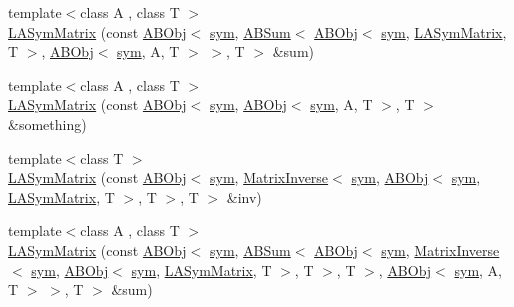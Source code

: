 \begin{DoxyCompactItemize}
\item 
{\footnotesize template$<$class A , class T $>$ }\\\mbox{\hyperlink{classROOT_1_1Minuit2_1_1LASymMatrix_a252615373ae5ffe035baa9e8221e67e3}{L\+A\+Sym\+Matrix}} (const \mbox{\hyperlink{classROOT_1_1Minuit2_1_1ABObj}{A\+B\+Obj}}$<$ \mbox{\hyperlink{classROOT_1_1Minuit2_1_1sym}{sym}}, \mbox{\hyperlink{classROOT_1_1Minuit2_1_1ABSum}{A\+B\+Sum}}$<$ \mbox{\hyperlink{classROOT_1_1Minuit2_1_1ABObj}{A\+B\+Obj}}$<$ \mbox{\hyperlink{classROOT_1_1Minuit2_1_1sym}{sym}}, \mbox{\hyperlink{classROOT_1_1Minuit2_1_1LASymMatrix}{L\+A\+Sym\+Matrix}}, T $>$, \mbox{\hyperlink{classROOT_1_1Minuit2_1_1ABObj}{A\+B\+Obj}}$<$ \mbox{\hyperlink{classROOT_1_1Minuit2_1_1sym}{sym}}, A, T $>$ $>$, T $>$ \&sum)
\item 
{\footnotesize template$<$class A , class T $>$ }\\\mbox{\hyperlink{classROOT_1_1Minuit2_1_1LASymMatrix_ac807736f91c64875cb01e13050a6c925}{L\+A\+Sym\+Matrix}} (const \mbox{\hyperlink{classROOT_1_1Minuit2_1_1ABObj}{A\+B\+Obj}}$<$ \mbox{\hyperlink{classROOT_1_1Minuit2_1_1sym}{sym}}, \mbox{\hyperlink{classROOT_1_1Minuit2_1_1ABObj}{A\+B\+Obj}}$<$ \mbox{\hyperlink{classROOT_1_1Minuit2_1_1sym}{sym}}, A, T $>$, T $>$ \&something)
\item 
{\footnotesize template$<$class T $>$ }\\\mbox{\hyperlink{classROOT_1_1Minuit2_1_1LASymMatrix_a0089b4055d0d08767d7072657b6f87d5}{L\+A\+Sym\+Matrix}} (const \mbox{\hyperlink{classROOT_1_1Minuit2_1_1ABObj}{A\+B\+Obj}}$<$ \mbox{\hyperlink{classROOT_1_1Minuit2_1_1sym}{sym}}, \mbox{\hyperlink{classROOT_1_1Minuit2_1_1MatrixInverse}{Matrix\+Inverse}}$<$ \mbox{\hyperlink{classROOT_1_1Minuit2_1_1sym}{sym}}, \mbox{\hyperlink{classROOT_1_1Minuit2_1_1ABObj}{A\+B\+Obj}}$<$ \mbox{\hyperlink{classROOT_1_1Minuit2_1_1sym}{sym}}, \mbox{\hyperlink{classROOT_1_1Minuit2_1_1LASymMatrix}{L\+A\+Sym\+Matrix}}, T $>$, T $>$, T $>$ \&inv)
\item 
{\footnotesize template$<$class A , class T $>$ }\\\mbox{\hyperlink{classROOT_1_1Minuit2_1_1LASymMatrix_a50ecd9916b1ca8941c767d16dbdb9b65}{L\+A\+Sym\+Matrix}} (const \mbox{\hyperlink{classROOT_1_1Minuit2_1_1ABObj}{A\+B\+Obj}}$<$ \mbox{\hyperlink{classROOT_1_1Minuit2_1_1sym}{sym}}, \mbox{\hyperlink{classROOT_1_1Minuit2_1_1ABSum}{A\+B\+Sum}}$<$ \mbox{\hyperlink{classROOT_1_1Minuit2_1_1ABObj}{A\+B\+Obj}}$<$ \mbox{\hyperlink{classROOT_1_1Minuit2_1_1sym}{sym}}, \mbox{\hyperlink{classROOT_1_1Minuit2_1_1MatrixInverse}{Matrix\+Inverse}}$<$ \mbox{\hyperlink{classROOT_1_1Minuit2_1_1sym}{sym}}, \mbox{\hyperlink{classROOT_1_1Minuit2_1_1ABObj}{A\+B\+Obj}}$<$ \mbox{\hyperlink{classROOT_1_1Minuit2_1_1sym}{sym}}, \mbox{\hyperlink{classROOT_1_1Minuit2_1_1LASymMatrix}{L\+A\+Sym\+Matrix}}, T $>$, T $>$, T $>$, \mbox{\hyperlink{classROOT_1_1Minuit2_1_1ABObj}{A\+B\+Obj}}$<$ \mbox{\hyperlink{classROOT_1_1Minuit2_1_1sym}{sym}}, A, T $>$ $>$, T $>$ \&sum)

\end{DoxyCompactItemize}
